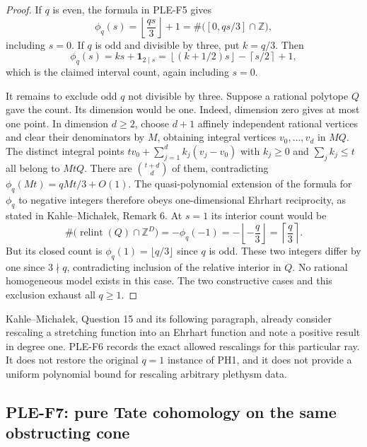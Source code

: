 \begin{proof}
If $q$ is even, the formula in PLE-F5 gives
\[
 \phi_q(s)=\left\lfloor\frac{qs}{3}\right\rfloor+1
 =\#\bigl([0,qs/3]\cap\mathbb Z\bigr),
\]
including $s=0$. If $q$ is odd and divisible by three, put $k=q/3$.
Then
\[
 \phi_q(s)=ks+\mathbf1_{2\mid s}
 =\left\lfloor(k+1/2)s\right\rfloor
  -\left\lceil s/2\right\rceil+1,
\]
which is the claimed interval count, again including $s=0$.

It remains to exclude odd $q$ not divisible by three. Suppose a rational
polytope $Q$ gave the count. Its dimension would be one. Indeed,
dimension zero gives at most one point. In dimension $d\ge2$, choose
$d+1$ affinely independent rational vertices and clear their denominators
by $M$, obtaining integral vertices $v_0,\ldots,v_d$ in $MQ$. The distinct
integral points
$tv_0+\sum_{j=1}^d k_j(v_j-v_0)$ with $k_j\ge0$ and
$\sum_jk_j\le t$ all belong to $MtQ$. There are
$\binom{t+d}{d}$ of them, contradicting
$\phi_q(Mt)=qMt/3+O(1)$.
The quasi-polynomial extension of the formula for $\phi_q$ to negative
integers therefore obeys one-dimensional Ehrhart reciprocity, as stated
in Kahle--Micha\l ek, Remark 6. At $s=1$ its interior count would be
\[
 \#\bigl(\operatorname{relint}(Q)\cap\mathbb Z^D\bigr)
 =-\phi_q(-1)
 =-\left\lfloor-\frac q3\right\rfloor
 =\left\lceil\frac q3\right\rceil.
\]
But its closed count is
$\phi_q(1)=\lfloor q/3\rfloor$ since $q$ is odd. These two integers
differ by one since $3\nmid q$, contradicting inclusion of the relative
interior in $Q$. No rational homogeneous model exists in this case.
The two constructive cases and this exclusion exhaust all $q\ge1$.
\end{proof}

Kahle--Micha\l ek, Question 15 and its following paragraph, already
consider rescaling a stretching function into an Ehrhart function and
note a positive result in degree one. PLE-F6 records the exact allowed
rescalings for this particular ray. It does not restore the original
$q=1$ instance of PH1, and it does not provide a uniform polynomial bound
for rescaling arbitrary plethysm data.

\subsection{PLE-F7: pure Tate cohomology on the same obstructing cone}
